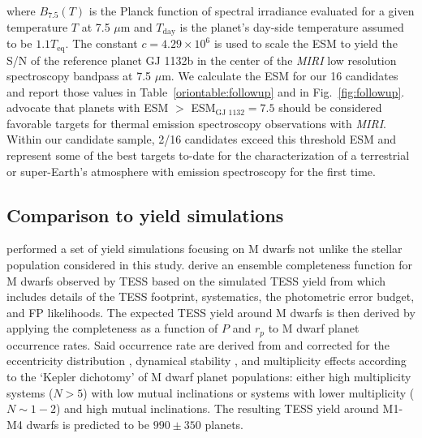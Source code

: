\noindent where $B_{7.5}(T)$ is the Planck function of spectral irradiance evaluated for a given temperature
$T$ at 7.5 $\mu$m and $T_{\text{day}}$ is the planet's day-side temperature assumed to be $1.1T_{\text{eq}}$.
The constant $c=4.29\times 10^6$ is used to scale the ESM to yield the S/N of the reference planet GJ 1132b
\citep{berta15,dittmann17b} in the center of the \emph{MIRI} low resolution spectroscopy bandpass at 7.5 $\mu$m. 
We calculate the ESM for our 16 candidates and report those values in Table~\ref{oriontable:followup} and in
Fig.~\ref{fig:followup}. \citep{kempton18} advocate that planets with ESM $>$ ESM$_{\text{GJ 1132}}=7.5$ should
be considered favorable targets for thermal emission spectroscopy observations with \emph{MIRI}. Within our
candidate sample, 2/16 candidates exceed this threshold ESM and represent some of the best targets to-date for
the characterization of a terrestrial or super-Earth's atmosphere with emission spectroscopy for the first time.


\subsection{Comparison to yield simulations}
\cite{ballard18} performed a set of yield simulations focusing on M dwarfs not unlike the
stellar population considered in this study. \cite{ballard18} derive an ensemble completeness
function for M dwarfs observed by TESS based on the simulated TESS yield
from \cite{sullivan15} which includes details of the TESS footprint, systematics, the
photometric error budget, and FP likelihoods. The expected TESS yield around M dwarfs is
then derived by applying the completeness as a function of $P$ and $r_p$ to M dwarf planet
occurrence rates. Said occurrence rate are
derived from \cite{dressing15a} and corrected for the eccentricity
distribution \citep{limbach15}, dynamical stability \citep{fabrycky12}, and multiplicity
effects according to the `Kepler dichotomy' \citep{ballard16} of M dwarf planet populations:
either high multiplicity systems ($N>5$) with low mutual inclinations or systems with lower
multiplicity ($N\sim 1-2$) and high mutual inclinations. The resulting TESS yield
around M1-M4 dwarfs is predicted to be $990 \pm 350$ planets.  \\

